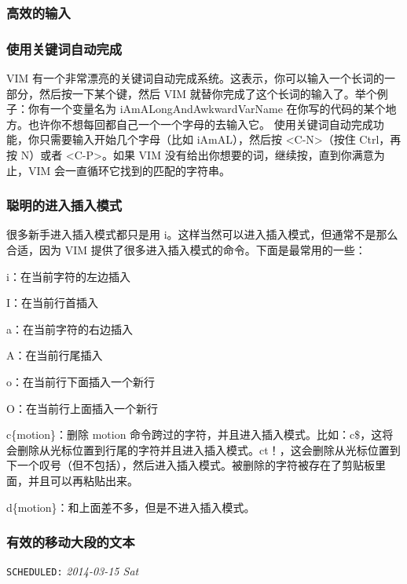 \documentclass[11pt]{article}
\begin{document}
\subsubsection{高效的输入}
\label{sec-12-5-6}
\subsubsection{使用关键词自动完成}
\label{sec-12-5-7}

    VIM 有一个非常漂亮的关键词自动完成系统。这表示，你可以输入一个长词的一部分，然后按一下某个键，然后 VIM 就替你完成了这个长词的输入了。举个例子：你有一个变量名为 iAmALongAndAwkwardVarName 在你写的代码的某个地方。也许你不想每回都自己一个一个字母的去输入它。
    使用关键词自动完成功能，你只需要输入开始几个字母（比如 iAmAL），然后按 <C-N>（按住 Ctrl，再按 N）或者 <C-P>。如果 VIM 没有给出你想要的词，继续按，直到你满意为止，VIM 会一直循环它找到的匹配的字符串。
\subsubsection{聪明的进入插入模式}
\label{sec-12-5-8}

    很多新手进入插入模式都只是用 i。这样当然可以进入插入模式，但通常不是那么合适，因为 VIM 提供了很多进入插入模式的命令。下面是最常用的一些：

    i：在当前字符的左边插入

    I：在当前行首插入

    a：在当前字符的右边插入

    A：在当前行尾插入

    o：在当前行下面插入一个新行

    O：在当前行上面插入一个新行

    c\{motion\}：删除 motion 命令跨过的字符，并且进入插入模式。比如：c\$，这将会删除从光标位置到行尾的字符并且进入插入模式。ct！，这会删除从光标位置到下一个叹号（但不包括），然后进入插入模式。被删除的字符被存在了剪贴板里面，并且可以再粘贴出来。

    d\{motion\}：和上面差不多，但是不进入插入模式。
\subsubsection{有效的移动大段的文本}
\label{sec-12-5-9}

    \texttt{SCHEDULED:} \textit{2014-03-15 Sat}
\end{document}
